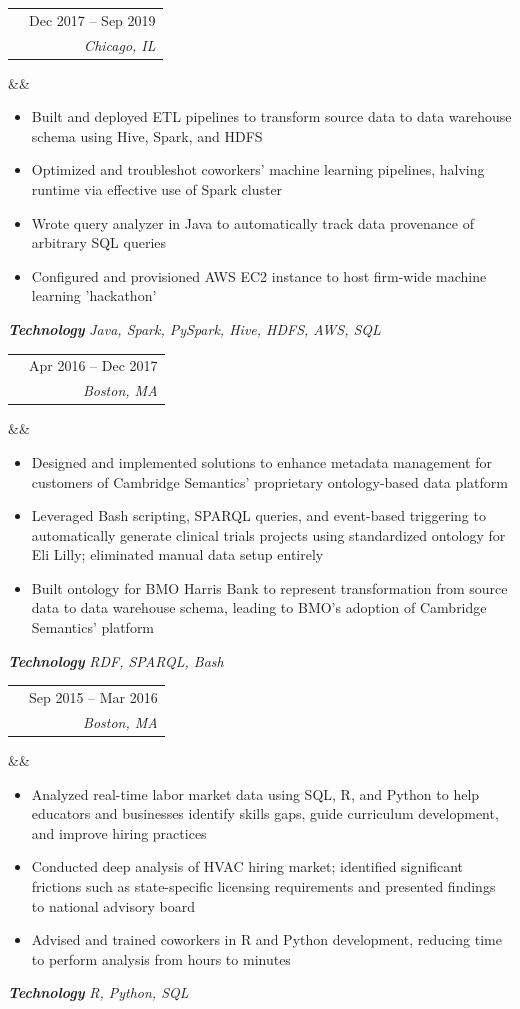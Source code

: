 \documentclass[10pt,letterpaper]{moderncv}
\makeatletter
\renewcommand*{\cventry}[7][.25em]{%
  \begin{tabular*}{\maincolumnwidth}{l@{\extracolsep{\fill}}r}%
    \ifboolexpr{%
      test {\ifstrempty{#4}}
      and
      test {\ifstrempty{#2}}}%
      {}%
      {{\fontsize{9}{10.8}\selectfont\bfseries #4} & {#2}\\}%
    {\itshape #3\ifstrempty{#6}{}{, #6}} & {\itshape #5}\\%
  \end{tabular*}%
  \ifx&#7&%
  \else{\\%
    \begin{minipage}{\maincolumnwidth}%
      \small#7%
    \end{minipage}}\fi%
  \par\addvspace{#1}}
\makeatother
\begin{document}
\cventry{Dec 2017 -- Sep 2019}{Enterprise Platform Specialist}{\textcolor[rgb]{0,0,1}{BMO Harris Bank}}{Chicago, IL}{}{}
\begin{itemize}
  \item Built and deployed ETL pipelines to transform source data to data warehouse schema using Hive, Spark, and HDFS
  \item Optimized and troubleshot coworkers' machine learning pipelines, halving runtime via effective use of Spark cluster
  \item Wrote query analyzer in Java to automatically track data provenance of arbitrary SQL queries
  \item Configured and provisioned AWS EC2 instance to host firm-wide machine learning 'hackathon'
\end{itemize}
\vspace{0.2em}
\textbf{\textit{Technology}} \textit{Java, Spark, PySpark, Hive, HDFS, AWS, SQL}

\vspace{0.4em}

\cventry{Apr 2016 -- Dec 2017}{Solutions Engineer}{\textcolor[rgb]{0,0,1}{Cambridge Semantics, Inc.}}{Boston, MA}{}{}
\begin{itemize}
  \item Designed and implemented solutions to enhance metadata management for customers of Cambridge Semantics' proprietary ontology-based data platform
  \item Leveraged Bash scripting, SPARQL queries, and event-based triggering to automatically generate clinical trials projects using standardized ontology for Eli Lilly; eliminated manual data setup entirely
  \item Built ontology for BMO Harris Bank to represent transformation from source data to data warehouse schema, leading to BMO's adoption of Cambridge Semantics' platform
\end{itemize}
\vspace{0.2em}
\textbf{\textit{Technology}} \textit{RDF, SPARQL, Bash}

\vspace{0.4em}

\cventry{Sep 2015 -- Mar 2016}{Research Analyst}{\textcolor[rgb]{0,0,1}{Burning Glass Technologies}}{Boston, MA}{}{}
\begin{itemize}
  \item Analyzed real-time labor market data using SQL, R, and Python to help educators and businesses identify skills gaps, guide curriculum development, and improve hiring practices
  \item Conducted deep analysis of HVAC hiring market; identified significant frictions such as state-specific licensing requirements and presented findings to national advisory board
  \item Advised and trained coworkers in R and Python development, reducing time to perform analysis from hours to minutes
\end{itemize}
\vspace{0.2em}
\textbf{\textit{Technology}} \textit{R, Python, SQL}
\end{document}
